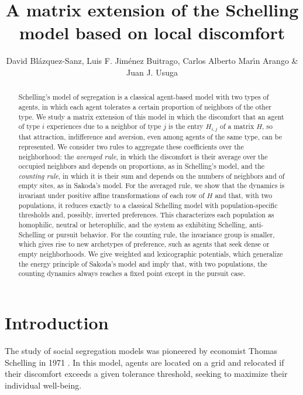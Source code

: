 \documentclass{article}
\title{A matrix extension of the Schelling model based on local discomfort
}
\author{David Bl\'azquez-Sanz, Luis F. Jim\'enez Buitrago, Carlos Alberto Mar\'{\i}n Arango \& Juan J. Usuga }
\theoremstyle{remark}
\begin{document}
\maketitle

\begin{abstract}
Schelling's model of segregation is a classical agent-based model with two types of agents, in which each agent tolerates a certain proportion of neighbors of the other type. We study a matrix extension of this model in which the discomfort that an agent of type $i$ experiences due to a neighbor of type $j$ is the entry $H_{i,j}$ of a matrix $H$, so that attraction, indifference and aversion, even among agents of the same type, can be represented. We consider two rules to aggregate these coefficients over the neighborhood: the \emph{averaged rule}, in which the discomfort is their average over the occupied neighbors and depends on proportions, as in Schelling's model, and the \emph{counting rule}, in which it is their sum and depends on the numbers of neighbors and of empty sites, as in Sakoda's model. For the averaged rule, we show that the dynamics is invariant under positive affine transformations of each row of $H$ and that, with two populations, it reduces exactly to a classical Schelling model with population-specific thresholds and, possibly, inverted preferences. This characterizes each population as homophilic, neutral or heterophilic, and the system as exhibiting Schelling, anti-Schelling or pursuit behavior. For the counting rule, the invariance group is smaller, which gives rise to new archetypes of preference, such as agents that seek dense or empty neighborhoods. We give weighted and lexicographic potentials, which generalize the energy principle of Sakoda's model and imply that, with two populations, the counting dynamics always reaches a fixed point except in the pursuit case.
\end{abstract}

\section{Introduction}

The study of social segregation models was pioneered by economist Thomas Schelling in 1971 \cite{schelling1971dynamic}. In this model, agents are located on a grid and relocated if their discomfort exceeds a given tolerance threshold, seeking to maximize their individual well-being.
\end{document}
